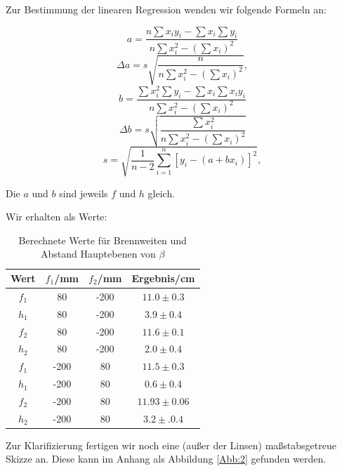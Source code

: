 \documentclass[11pt,a4paper]{article}
\begin{document}
Zur Bestimmung der linearen Regression wenden wir folgende Formeln an:

\begin{equation}
a=\frac{n\sum x_iy_i-\sum x_i\sum y_i}{n\sum x_i^2-(\sum x_i)^2}
\end{equation}
\begin{equation}
\Delta a=s\sqrt{\frac{n}{n\sum x_i^2-(\sum x_i)^2}},
\end{equation}
\begin{equation}
b=\frac{\sum x_i^2\sum y_i-\sum x_i\sum x_iy_i}{n\sum x_i^2-(\sum x_i)^2}
\end{equation}
\begin{equation}
\Delta b=s\sqrt{\frac{\sum x_i^2}{n\sum x_i^2-(\sum x_i)^2}}
\end{equation}
\begin{equation}
s=\sqrt{\frac{1}{n-2}\sum^n_{i=1}[y_i-(a+bx_i)]^2},
\end{equation}

Die $a$ und $b$ sind jeweils $f$ und $h$ gleich.

Wir erhalten als Werte:

\begin{table}[h]
\centering
\caption{Berechnete Werte f\"ur Brennweiten und Abstand Hauptebenen von $\beta$} \vspace{11pt}
\begin{tabular}{cccc}
\toprule
\textrm{Wert} & $f_1$/\textrm{mm} & $f_2$/\textrm{mm} & \textrm{Ergebnis}/\textrm{cm} \\
\midrule 
$f_1$ & 80 & -200 & $11.0\pm0.3$\\
$h_1$ & 80 & -200 & $3.9\pm0.4$\\
$f_2$ & 80 & -200 & $11.6\pm0.1$\\
$h_2$ & 80 & -200 & $2.0\pm0.4$\\
$f_1$ & -200 & 80 & $11.5\pm0.3$\\
$h_1$ & -200 & 80 & $0.6\pm0.4$\\
$f_2$ & -200 & 80 & $11.93\pm0.06$\\
$h_2$ & -200 & 80 & $3.2\pm.0.4$\\
\bottomrule
\end{tabular}
\label{Tab:1}
\end{table}


Zur Klarifizierung fertigen wir noch eine (au\ss er der Linsen) ma\ss stabsgetreue Skizze an. Diese kann im Anhang als Abbildung \ref{Abb:2} gefunden werden.\\
\end{document}
